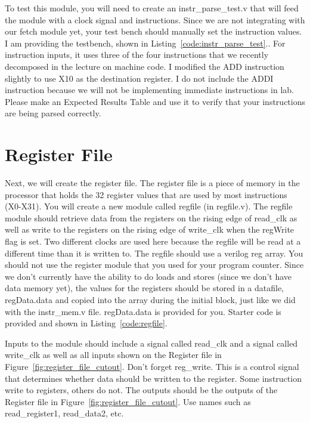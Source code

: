 To test this module, you will need to create an instr\_parse\_test.v that will feed the module with a clock signal and instructions.  Since we are not integrating with our fetch module yet, your test bench should manually set the instruction values.  I am providing the testbench, shown in Listing~\ref{code:instr_parse_test}..  For instruction inputs, it uses three of the four instructions that we recently decomposed in the lecture on machine code.  I modified the ADD instruction slightly to use X10 as the destination register.  I do not include the ADDI instruction because we will not be implementing immediate instructions in lab.  Please make an Expected Results Table and use it to verify that your instructions are being parsed correctly.


\section{Register File}

Next, we will create the register file.  The register file is a piece of memory in the processor that holds the 32 register values that are used by most instructions (X0-X31).  You will create a new module called regfile (in regfile.v).  The regfile module should retrieve data from the registers on the rising edge of read\_clk as well as write to the registers on the rising edge of write\_clk when the regWrite flag is set.  Two different clocks are used here because the regfile will be read at a different time than it is written to.  The regfile should use a verilog reg array.  You should not use the register module that you used for your program counter.  Since we don't currently have the ability to do loads and stores (since we don't have data memory yet), the values for the registers should be stored in a datafile, regData.data and copied into the array during the initial block, just like we did with the instr\_mem.v file.  regData.data is provided for you.  Starter code is provided and shown in Listing~\ref{code:regfile}.


Inputs to the module should include a signal called read\_clk and a signal called write\_clk as well as all inputs shown on the Register file in Figure~\ref{fig:register_file_cutout}.  Don't forget reg\_write.  This is a control signal that determines whether data should be written to the register.  Some instruction write to registers, others do not.  The outputs should be the outputs of the Register file in Figure~\ref{fig:register_file_cutout}.  Use names such as read\_register1, read\_data2, etc.

